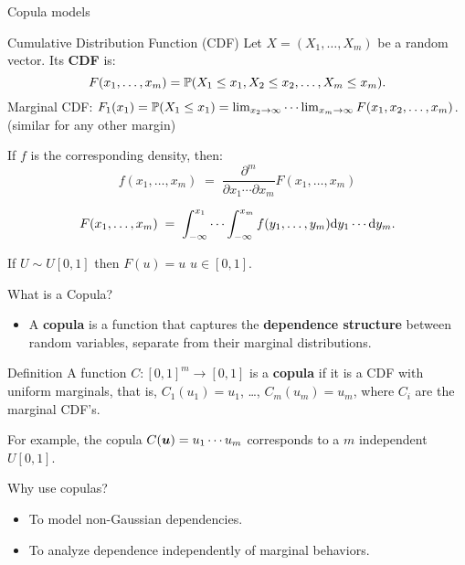 \documentclass[11pt,handout,aspectratio=169]{beamer}
\begin{document}
\begin{frame}{}
	\begin{center}
		{\Huge \alert{Copula models}}
	\end{center}
\end{frame}

\begin{frame}{Cumulative Distribution Function (CDF)}
	Let $X=(X_1,\ldots,X_m)$ be a random vector.  Its \textbf{CDF} is: $$F(x_1,\ldots,x_m)=\P(X_1\leq x_1,X_2\leq x_2,\ldots,X_m\leq x_m).$$
	Marginal CDF: $F_1(x_1)=\P(X_1\leq x_1)=\lim_{x_2\to \infty}\cdots\lim_{x_m\to\infty}F(x_1,x_2,\ldots,x_m)$.
	(similar for any other margin)\\[5mm]	
	\begin{block}{}
	If $f$ is the corresponding density, then:
	$$
	f(x_1,\ldots,x_m)\;=\;\frac{\partial^m}{\partial x_1\cdots\partial x_m}F(x_1,\ldots,x_m)
	$$
	
	$$
	F(x_1,\ldots,x_m)\;=\;\int_{-\infty}^{x_1}\cdots \int_{-\infty}^{x_m} f(y_1,\ldots,y_m){\rm d}y_1\cdots {\rm d} y_m. 
	$$		
	\end{block}
		If $U\sim U[0,1]$ then $F(u)=u$ $u\in [0,1]$.

\end{frame}


\begin{frame}{What is a Copula?}
\begin{itemize}
    \item A \textbf{copula} is a function that captures the \textbf{dependence structure} between random variables, separate from their marginal distributions.
\end{itemize}
\begin{alertblock}{Definition}
	A function $C : [0, 1]^m \to [0, 1]$ is a \textbf{copula} if it is a CDF with uniform marginals, that is, $C_1(u_1)=u_1$, \ldots, $C_m(u_m)=u_m$, where $C_i$ are the marginal CDF's.
\end{alertblock}
For example, the copula $C(\bs u)=u_1\cdots u_m$ corresponds to a $m$ independent $U[0,1]$.
\begin{block}{Why use copulas?}
	\begin{itemize}
        \item To model non-Gaussian dependencies.
        \item To analyze dependence independently of marginal behaviors.
    \end{itemize}
\end{block}
\end{frame}
\end{document}
